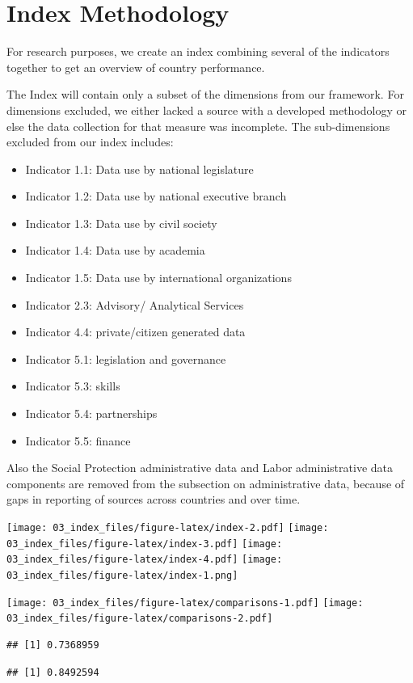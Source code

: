 \documentclass[
]{article}
\providecommand{\tightlist}{%
  \setlength{\itemsep}{0pt}\setlength{\parskip}{0pt}}
\begin{document}
\hypertarget{index-methodology}{%
\section{Index Methodology}\label{index-methodology}}

For research purposes, we create an index combining several of the
indicators together to get an overview of country performance.

The Index will contain only a subset of the dimensions from our
framework. For dimensions excluded, we either lacked a source with a
developed methodology or else the data collection for that measure was
incomplete. The sub-dimensions excluded from our index includes:

\begin{itemize}
\tightlist
\item
  Indicator 1.1: Data use by national legislature\\
\item
  Indicator 1.2: Data use by national executive branch\\
\item
  Indicator 1.3: Data use by civil society\\
\item
  Indicator 1.4: Data use by academia\\
\item
  Indicator 1.5: Data use by international organizations\\
\item
  Indicator 2.3: Advisory/ Analytical Services\\
\item
  Indicator 4.4: private/citizen generated data\\
\item
  Indicator 5.1: legislation and governance\\
\item
  Indicator 5.3: skills\\
\item
  Indicator 5.4: partnerships\\
\item
  Indicator 5.5: finance
\end{itemize}

Also the Social Protection administrative data and Labor administrative
data components are removed from the subsection on administrative data,
because of gaps in reporting of sources across countries and over time.

\texttt{[image: 03\_index\_files/figure-latex/index-2.pdf]}
\texttt{[image: 03\_index\_files/figure-latex/index-3.pdf]}
\texttt{[image: 03\_index\_files/figure-latex/index-4.pdf]}
\texttt{[image: 03\_index\_files/figure-latex/index-1.png]}

\texttt{[image: 03\_index\_files/figure-latex/comparisons-1.pdf]}
\texttt{[image: 03\_index\_files/figure-latex/comparisons-2.pdf]}

\begin{verbatim}
## [1] 0.7368959
\end{verbatim}

\begin{verbatim}
## [1] 0.8492594
\end{verbatim}
\end{document}
